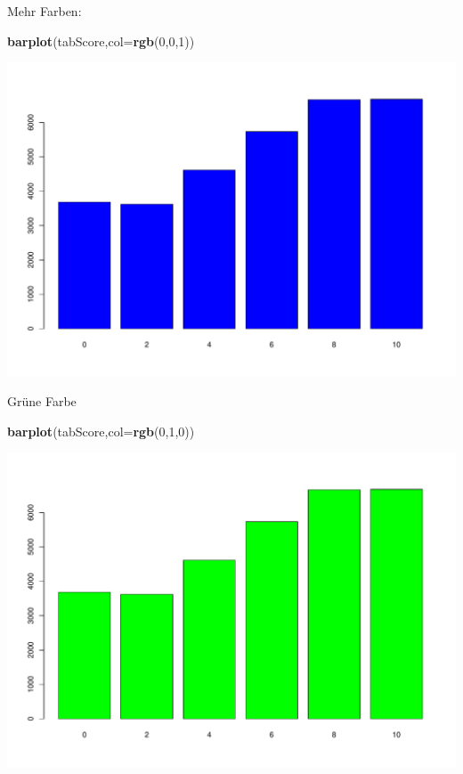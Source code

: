 \documentclass[ignorenonframetext,]{beamer}
\newenvironment{Shaded}{}{}
\newcommand{\KeywordTok}[1]{\textcolor[rgb]{0.00,0.44,0.13}{\textbf{{#1}}}}
\newcommand{\DataTypeTok}[1]{\textcolor[rgb]{0.56,0.13,0.00}{{#1}}}
\newcommand{\DecValTok}[1]{\textcolor[rgb]{0.25,0.63,0.44}{{#1}}}
\newcommand{\NormalTok}[1]{{#1}}
\begin{document}
\begin{frame}[fragile]{Mehr Farben:}

\begin{Shaded}
\begin{Highlighting}[]
\KeywordTok{barplot}\NormalTok{(tabScore,}\DataTypeTok{col=}\KeywordTok{rgb}\NormalTok{(}\DecValTok{0}\NormalTok{,}\DecValTok{0}\NormalTok{,}\DecValTok{1}\NormalTok{))}
\end{Highlighting}
\end{Shaded}

\includegraphics{R_intern_files/figure-beamer/unnamed-chunk-156-1.pdf}

\end{frame}

\begin{frame}[fragile]{Grüne Farbe}

\begin{Shaded}
\begin{Highlighting}[]
\KeywordTok{barplot}\NormalTok{(tabScore,}\DataTypeTok{col=}\KeywordTok{rgb}\NormalTok{(}\DecValTok{0}\NormalTok{,}\DecValTok{1}\NormalTok{,}\DecValTok{0}\NormalTok{))}
\end{Highlighting}
\end{Shaded}

\includegraphics{R_intern_files/figure-beamer/unnamed-chunk-157-1.pdf}

\end{frame}
\end{document}
